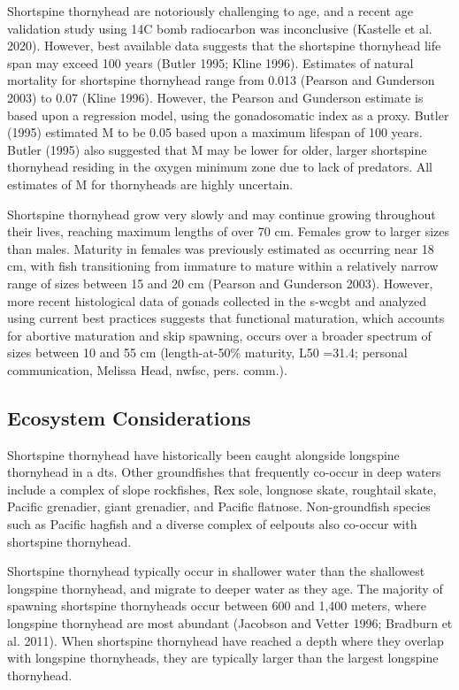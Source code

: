 \documentclass[11pt,
  english,
  letterpaper,
]{article}
\begin{document}
Shortspine thornyhead are notoriously challenging to age, and a recent age validation study using 14C bomb radiocarbon was inconclusive (Kastelle et al. 2020). However, best available data suggests that the shortspine thornyhead life span may exceed 100 years (Butler 1995; Kline 1996). Estimates of natural mortality for shortspine thornyhead range from 0.013 (Pearson and Gunderson 2003) to 0.07 (Kline 1996). However, the Pearson and Gunderson estimate is based upon a regression model, using the gonadosomatic index as a proxy. Butler (1995) estimated M to be 0.05 based upon a maximum lifespan of 100 years. Butler (1995) also suggested that M may be lower for older, larger shortspine thornyhead residing in the oxygen minimum zone due to lack of predators. All estimates of M for thornyheads are highly uncertain.

Shortspine thornyhead grow very slowly and may continue growing throughout their lives, reaching maximum lengths of over 70 cm. Females grow to larger sizes than males. Maturity in females was previously estimated as occurring near 18 cm, with fish transitioning from immature to mature within a relatively narrow range of sizes between 15 and 20 cm (Pearson and Gunderson 2003). However, more recent histological data of gonads collected in the \gls{s-wcgbt} and analyzed using current best practices suggests that functional maturation, which accounts for abortive maturation and skip spawning, occurs over a broader spectrum of sizes between 10 and 55 cm (length-at-50\% maturity, L50 =31.4; personal communication, Melissa Head, \gls{nwfsc}, pers. comm.).

\hypertarget{ecosystem-considerations-1}{%
\subsection{Ecosystem Considerations}\label{ecosystem-considerations-1}}

Shortspine thornyhead have historically been caught alongside longspine thornyhead in a \gls{dts}. Other groundfishes that frequently co-occur in deep waters include a complex of slope rockfishes, Rex sole, longnose skate, roughtail skate, Pacific grenadier, giant grenadier, and Pacific flatnose. Non-groundfish species such as Pacific hagfish and a diverse complex of eelpouts also co-occur with shortspine thornyhead.

Shortspine thornyhead typically occur in shallower water than the shallowest longspine thornyhead, and migrate to deeper water as they age. The majority of spawning shortspine thornyheads occur between 600 and 1,400 meters, where longspine thornyhead are most abundant (Jacobson and Vetter 1996; Bradburn et al. 2011). When shortspine thornyhead have reached a depth where they overlap with longspine thornyheads, they are typically larger than the largest longspine thornyhead.
\end{document}
